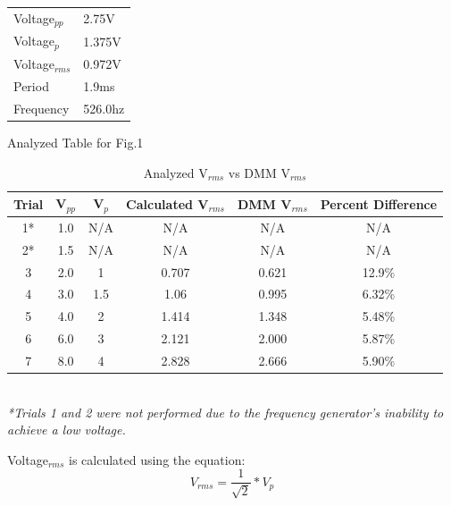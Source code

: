 \documentclass{article}
\begin{document}
	      \hfill
	     \begin{minipage}[b]{0.4\textwidth}
		 \begin{center}
		 \begin{tabular}{|l|l|}
			 \hline
			 Voltage$_{pp}$ & 2.75V \\
			 Voltage$_{p}$ & 1.375V \\
			 Voltage$_{rms}$ & 0.972V \\
			 Period & 1.9ms \\
			 Frequency & 526.0hz \\
			 \hline
			 \end{tabular}	
		 \end{center}
		 \vspace{0.5cm}
		 \begin{center}
			Analyzed Table for Fig.1
		 \end{center}
		 \end{minipage}
		 \vspace{0.8cm}
		 \begin{table}[h]
			 \begin{center}
			\caption{Analyzed V$_{rms}$ vs DMM V$_{rms}$}
		\begin{tabular}{c|c|c|c|c|c}
			\textbf{Trial} & \textbf{V$_{pp}$} &\textbf{ V$_{p}$} & \textbf{Calculated V$_{rms}$} &\textbf{ DMM V$_{rms}$} &\textbf{Percent Difference}\\
			\hline
			1* & 1.0 &N\slash A &N\slash A &N\slash A &N\slash A \\
			2* & 1.5 &N\slash A &N\slash A &N\slash A &N\slash A \\
			3 & 2.0 &1 &0.707 &0.621 &12.9\% \\
			4 & 3.0 &1.5 &1.06 &0.995 &6.32\% \\
			5 & 4.0 &2 &1.414 &1.348 &5.48\% \\
			6 & 6.0 &3 &2.121 &2.000 &5.87\%\\
			7 & 8.0 &4 &2.828 &2.666 &5.90\%\\


		\end{tabular}\\
	\textit{*Trials 1 and 2 were not performed due to the frequency generator's inability to achieve a low voltage.}
	\end{center}
	\end{table}
	Voltage$_{rms}$ is calculated using the equation:
	\[
		V_{rms} = \frac{1}{\sqrt{2}} * V_{p}
	\]
\end{document}

